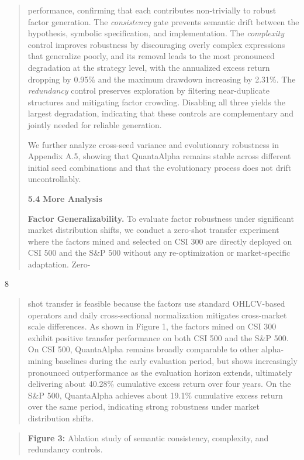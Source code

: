 \documentclass[
]{article}
\begin{document}
\begin{quote}
performance, confirming that each contributes non-trivially to robust
factor generation. The \emph{consistency} gate prevents semantic drift
between the hypothesis, symbolic specification, and implementation. The
\emph{complexity} control improves robustness by discouraging overly
complex expressions that generalize poorly, and its removal leads to the
most pronounced degradation at the strategy level, with the annualized
excess return dropping by 0.95\% and the maximum drawdown increasing by
2.31\%. The \emph{redundancy} control preserves exploration by filtering
near-duplicate structures and mitigating factor crowding. Disabling all
three yields the largest degradation, indicating that these controls are
complementary and jointly needed for reliable generation.

We further analyze cross-seed variance and evolutionary robustness in
Appendix A.5, showing that QuantaAlpha remains stable across different
initial seed combinations and that the evolutionary process does not
drift uncontrollably.

\textbf{5.4} \textbf{More Analysis}

\textbf{Factor Generalizability.} To evaluate factor robustness under
significant market distribution shifts, we conduct a zero-shot transfer
experiment where the factors mined and selected on CSI 300 are directly
deployed on CSI 500 and the S\&P 500 without any re-optimization or
market-specific adaptation. Zero-
\end{quote}

8

\begin{quote}
shot transfer is feasible because the factors use standard OHLCV-based
operators and daily cross-sectional normalization mitigates cross-market
scale differences. As shown in Figure 1, the factors mined on CSI 300
exhibit positive transfer performance on both CSI 500 and the S\&P 500.
On CSI 500, QuantaAlpha remains broadly comparable to other alpha-mining
baselines during the early evaluation period, but shows increasingly
pronounced outperformance as the evaluation horizon extends, ultimately
delivering about 40.28\% cumulative excess return over four years. On the
S\&P 500, QuantaAlpha achieves about 19.1\% cumulative excess return over
the same period, indicating strong robustness under market distribution
shifts.
\end{quote}

\begin{quote}
\textbf{Figure 3:} Ablation study of semantic consistency, complexity, and
redundancy controls.
\end{quote}
\end{document}
